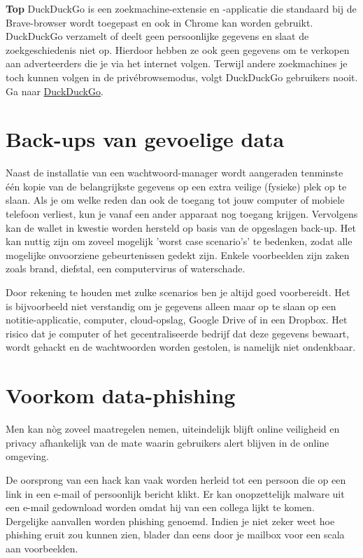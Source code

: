 \begin{topbox}{\textbf{Top}}
    DuckDuckGo is een zoekmachine-extensie en -applicatie die standaard bij de Brave-browser wordt toegepast en ook in Chrome kan worden gebruikt. DuckDuckGo verzamelt of deelt geen persoonlijke gegevens en slaat de zoekgeschiedenis niet op. Hierdoor hebben ze ook geen gegevens om te verkopen aan adverteerders die je via het internet volgen. Terwijl andere zoekmachines je toch kunnen volgen in de priv{\'e}browsemodus, volgt DuckDuckGo gebruikers nooit.
    \tcblower
    Ga naar \href{https://duckduckgo.com/}{DuckDuckGo}.
\end{topbox}

\section{Back-ups van gevoelige data}
Naast de installatie van een wachtwoord-manager wordt aangeraden tenminste {\'e}{\'e}n kopie van de belangrijkste gegevens op een extra veilige (fysieke) plek op te slaan. Als je om welke reden dan ook de toegang tot jouw computer of mobiele telefoon verliest, kun je vanaf een ander apparaat nog toegang krijgen. Vervolgens kan de wallet in kwestie worden hersteld op basis van de opgeslagen back-up. Het kan nuttig zijn om zoveel mogelijk 'worst case scenario's' te bedenken, zodat alle mogelijke onvoorziene gebeurtenissen gedekt zijn. Enkele voorbeelden zijn zaken zoals brand, diefstal, een computervirus of waterschade.

Door rekening te houden met zulke scenarios ben je altijd goed voorbereidt. Het is bijvoorbeeld niet verstandig om je gegevens alleen maar op te slaan op een notitie-applicatie, computer, cloud-opslag, Google Drive of in een Dropbox. Het risico dat je computer of het gecentraliseerde bedrijf dat deze gegevens bewaart, wordt gehackt en de wachtwoorden worden gestolen, is namelijk niet ondenkbaar.\medskip



\section{Voorkom data-phishing}
Men kan n{\`o}g zoveel maatregelen nemen, uiteindelijk blijft online veiligheid en privacy afhankelijk van de mate waarin gebruikers alert blijven in de online omgeving.

De oorsprong van een hack kan vaak worden herleid tot een persoon die op een link in een e-mail of persoonlijk bericht klikt. Er kan onopzettelijk malware uit een e-mail gedownload worden omdat hij van een collega lijkt te komen. Dergelijke aanvallen worden phishing genoemd. Indien je niet zeker weet hoe phishing eruit zou kunnen zien, blader dan eens door je mailbox voor een scala aan voorbeelden.\medskip

